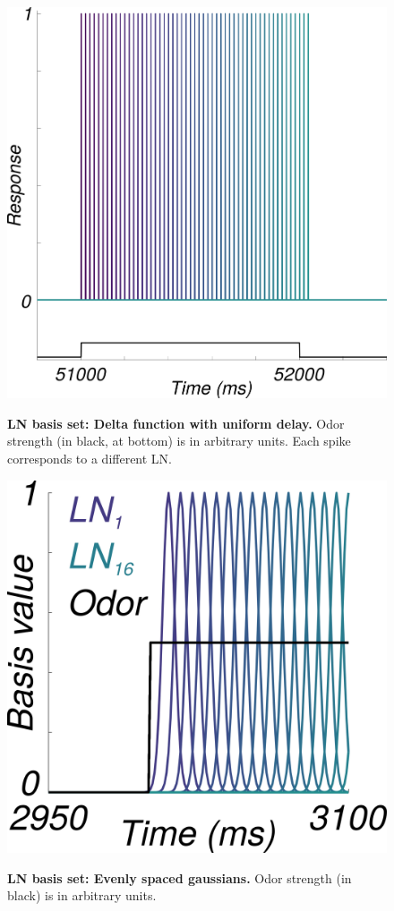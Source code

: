 \documentclass[a4paper,12pt,twoside]{article}
\begin{document}
\begin{figure}
\centering
\caption{\textbf{LN basis set: Delta function with uniform delay.}  Odor strength (in black, at bottom) is in arbitrary units. Each spike corresponds to a different LN. }
\hspace*{-1.0cm}
\includegraphics[scale=0.4]{2016-08-19_LNdelay_basis.png}
\label{fig:ln1}
\end{figure}
\begin{figure}
\centering
\caption{\textbf{LN basis set: Evenly spaced gaussians.}  Odor strength (in black) is in arbitrary units.}
\hspace*{-1.5cm}
\includegraphics[scale=0.5]{2016-08-26_LNgaussianBasis_excerpt.png}
\label{fig:ln2}
\end{figure}
\end{document}
